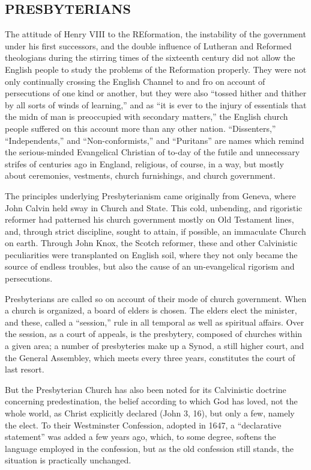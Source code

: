 \documentclass[
]{book}
\begin{document}
\hypertarget{presbyterians}{%
\subsection{PRESBYTERIANS}\label{presbyterians}}

The attitude of Henry VIII to the REformation, the instability of the government under his first successors, and the double influence of Lutheran and Reformed theologians during the stirring times of the sixteenth century did not allow the English people to study the problems of the Reformation properly. They were not only continually crossing the English Channel to and fro on account of persecutions of one kind or another, but they were also ``tossed hither and thither by all sorts of winds of learning,'' and as ``it is ever to the injury of essentials that the midn of man is preoccupied with secondary matters,'' the English church people suffered on this account more than any other nation. ``Dissenters,'' ``Independents,'' and ``Non-conformists,'' and ``Puritans'' are names which remind the serious-minded Evangelical Christian of to-day of the futile and unnecessary strifes of centuries ago in England, religious, of course, in a way, but mostly about ceremonies, vestments, church furnishings, and church government.

The principles underlying Presbyterianism came originally from Geneva, where John Calvin held sway in Church and State. This cold, unbending, and rigoristic reformer had patterned his church government mostly on Old Testament lines, and, through strict discipline, sought to attain, if possible, an immaculate Church on earth. Through John Knox, the Scotch reformer, these and other Calvinistic peculiarities were transplanted on English soil, where they not only became the source of endless troubles, but also the cause of an un-evangelical rigorism and persecutions.

Presbyterians are called so on account of their mode of church government. When a church is organized, a board of elders is chosen. The elders elect the minister, and these, called a ``session,'' rule in all temporal as well as spiritual affairs. Over the session, as a court of appeals, is the presbytery, composed of churches within a given area; a number of presbyteries make up a Synod, a still higher court, and the General Assembley, which meets every three years, constitutes the court of last resort.

But the Presbyterian Church has also been noted for its Calvinistic doctrine concerning predestination, the belief according to which God has loved, not the whole world, as Christ explicitly declared (John 3, 16), but only a few, namely the elect. To their Westminster Confession, adopted in 1647, a ``declarative statement'' was added a few years ago, which, to some degree, softens the language employed in the confession, but as the old confession still stands, the situation is practically unchanged.
\end{document}
